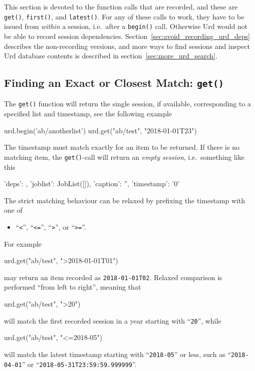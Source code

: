 This section is devoted to the function calls that are recorded, and
these are \texttt{get()}, \texttt{first()}, and \texttt{latest()}.
For any of these calls to work, they have to be issued
from \textsl{within} a session, i.e.\ after a \texttt{begin()} call.
Otherwise Urd would not be able to record session dependencies.
Section~\ref{sec:avoid_recording_urd_deps} describes the non-recording
versions, and more ways to find sessions and inspect Urd database
contents is described in section~\ref{sec:more_urd_search}.



\subsection{Finding an Exact or Closest Match:  \texttt{get()}}
\label{sec:urd_get}

The \texttt{get()} function will return the single session, if
available, corresponding to a specified list and timestamp, see the
following example
\begin{python}
urd.begin('ab/anotherlist')
urd.get("ab/test", "2018-01-01T23")
\end{python}
The timestamp must match exactly for an item to be returned.  If there
is no matching item, the \texttt{get()}-call will return
an \textsl{empty session}, i.e.\ something like this
\begin{python}
{'deps': {}, 'joblist': JobList([]), 'caption': '', 'timestamp': '0'}
\end{python}
The strict matching behaviour can be relaxed by prefixing the
timestamp with one of
\begin{itemize}
\item[] ``\texttt{<}'', ``\texttt{<=}'', ``\texttt{>}'', or ``\texttt{>=}''.
\end{itemize}
For example
\begin{python}
urd.get("ab/test", ">2018-01-01T01")
\end{python}
may return an item recorded as \texttt{2018-01-01T02}.  Relaxed
comparison is performed ``from left to right'', meaning that
\begin{python}
urd.get("ab/test", ">20")
\end{python}
will match the first recorded session in a year starting with
``\texttt{20}'', while
\begin{python}
urd.get("ab/test", "<=2018-05")
\end{python}
will match the latest timestamp starting with ``\texttt{2018-05}'' or less,
such as ``\texttt{2018-04-01}'' or ``\texttt{2018-05-31T23:59:59.999999}''.



